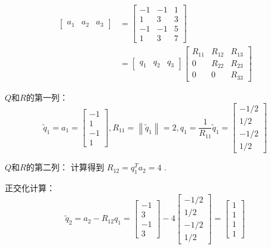 \begin{example}
    $$
\begin{aligned}
\left[\begin{array}{lll}
a_{1} & a_{2} & a_{3}
\end{array}\right] &=\left[\begin{array}{rrr}
-1 & -1 & 1 \\
1 & 3 & 3 \\
-1 & -1 & 5 \\
1 & 3 & 7
\end{array}\right] \\
&=\left[\begin{array}{lll}
q_{1} & q_{2} & q_{3}
\end{array}\right]\left[\begin{array}{ccc}
R_{11} & R_{12} & R_{13} \\
0 & R_{22} & R_{23} \\
0 & 0 & R_{33}
\end{array}\right]
\end{aligned}
$$

$Q$和$R$的第一列：
$$
\tilde{q}_{1}=a_{1}=\left[\begin{array}{r}
-1 \\
1 \\
-1 \\
1
\end{array}\right],  R_{11}=\left\|\tilde{q}_{1}\right\|=2,  q_{1}=\frac{1}{R_{11}} \tilde{q}_{1}=\left[\begin{array}{r}
-1 / 2 \\
1 / 2 \\
-1 / 2 \\
1 / 2
\end{array}\right]
$$

$Q$和$R$的第二列：
计算得到 $R_{12}=q_{1}^{T} a_{2}=4$ .

正交化计算：
$$
\tilde{q}_{2}=a_{2}-R_{12} q_{1}=\left[\begin{array}{r}
-1 \\
3 \\
-1 \\
3
\end{array}\right]-4\left[\begin{array}{c}
-1 / 2 \\
1 / 2 \\
-1 / 2 \\
1 / 2
\end{array}\right]=\left[\begin{array}{l}
1 \\
1 \\
1 \\
1
\end{array}\right]
$$


\end{example}
